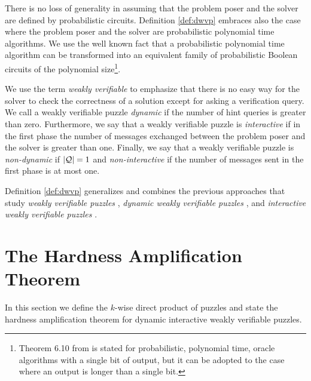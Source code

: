 There is no loss of generality in assuming that the problem poser and the solver are defined by probabilistic circuits.
Definition \ref{def:dwvp} embraces also the case where the problem poser and the solver are probabilistic polynomial time algorithms.
We use the well known fact \cite{LectureNotesCT} that a probabilistic polynomial time algorithm can be transformed into an equivalent
family of probabilistic Boolean circuits of the polynomial size\footnote{Theorem 6.10 from \cite{LectureNotesCT} is stated for probabilistic, polynomial time,
oracle algorithms with a single bit of output, but it can be adopted to the case where an output is longer than a single bit.}.

We use the term \textit{weakly verifiable} to emphasize that there is no easy way
for the solver to check the correctness of a solution except for asking a verification query.
We call a weakly verifiable puzzle \textit{dynamic} if the number of hint queries is greater than zero.
Furthermore, we say that a weakly verifiable puzzle is \textit{interactive} if in the first
phase the number of messages exchanged between the problem poser and the solver is greater than one.
Finally, we say that a weakly verifiable puzzle is \textit{non-dynamic} if $|\mathcal{Q}| = 1$
and \textit{non-interactive} if the number of messages sent in the first phase is at most one.

Definition \ref{def:dwvp} generalizes and combines the previous approaches that study
\textit{weakly verifiable puzzles} \cite{canetti2005hardness},
\textit{dynamic weakly verifiable puzzles} \cite{dodis2009security}, and \textit{interactive weakly verifiable puzzles} \cite{holenstein2011general}.

%
\section{The Hardness Amplification Theorem}
\label{section:hardness_amplification_diwvp}
In this section we define the $k$-wise direct product of puzzles and state the hardness amplification theorem for dynamic interactive weakly verifiable puzzles.

